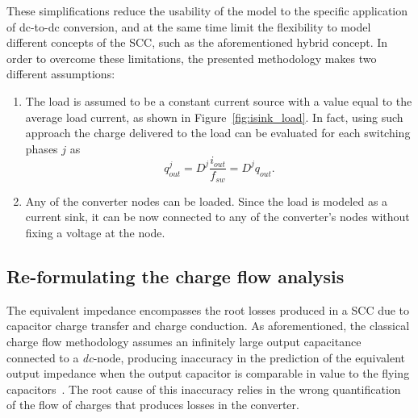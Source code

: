These simplifications reduce the usability of the model to the specific application of dc-to-dc conversion, and at the same time limit the flexibility to model different concepts of the SCC, such as the aforementioned hybrid concept. In order to overcome these limitations, the presented methodology makes two different assumptions:
\begin{enumerate}
  \item The load is assumed to be a constant current source with a value equal to the average load current, as shown in Figure~\ref{fig:isink_load}. In fact, using such approach the charge delivered to the load can be evaluated for each switching phases $j$ as
      \begin{equation}
        q_{out}^j = D^j \frac{i_{out}}{f_{sw}} = D^j q_{out}.
      \label{eq:q_out}
      \end{equation}

  \item Any of the converter nodes can be loaded. Since the load is modeled as a current sink, it can be now connected to any of the converter's nodes without fixing a voltage at the node.

\end{enumerate}


\subsection{Re-formulating the charge flow analysis}

The equivalent impedance encompasses the root losses produced in a SCC due to capacitor charge transfer and charge conduction. As aforementioned, the classical charge flow methodology assumes an infinitely large output capacitance connected to a \emph{dc}-node, producing inaccuracy in the prediction of the equivalent output impedance when the output capacitor is comparable in value to the flying capacitors~\cite{2013Breussegem:c_out}. The root cause of this inaccuracy relies in the wrong quantification of the flow of  charges that produces losses in the converter.\\    
   
